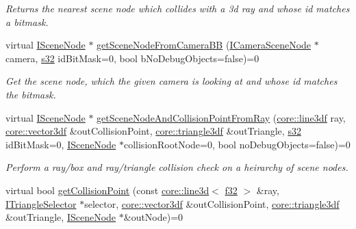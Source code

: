 \begin{DoxyCompactItemize}
\begin{DoxyCompactList}\small\item\em Returns the nearest scene node which collides with a 3d ray and whose id matches a bitmask. \end{DoxyCompactList}\item 
virtual \hyperlink{classirr_1_1scene_1_1ISceneNode}{I\+Scene\+Node} $\ast$ \hyperlink{classirr_1_1scene_1_1ISceneCollisionManager_ab29e0a261409a95a20e15ee09cc0de64}{get\+Scene\+Node\+From\+Camera\+BB} (\hyperlink{classirr_1_1scene_1_1ICameraSceneNode}{I\+Camera\+Scene\+Node} $\ast$camera, \hyperlink{namespaceirr_ac66849b7a6ed16e30ebede579f9b47c6}{s32} id\+Bit\+Mask=0, bool b\+No\+Debug\+Objects=false)=0
\begin{DoxyCompactList}\small\item\em Get the scene node, which the given camera is looking at and whose id matches the bitmask. \end{DoxyCompactList}\item 
virtual \hyperlink{classirr_1_1scene_1_1ISceneNode}{I\+Scene\+Node} $\ast$ \hyperlink{classirr_1_1scene_1_1ISceneCollisionManager_a25af822d52bce9acd88adfc7ce484982}{get\+Scene\+Node\+And\+Collision\+Point\+From\+Ray} (\hyperlink{namespaceirr_1_1core_acadb288f9aca3bf2d1222abcdf77114e}{core\+::line3df} ray, \hyperlink{namespaceirr_1_1core_ae6e2b2a6c552833ebbd5b7463d03586b}{core\+::vector3df} \&out\+Collision\+Point, \hyperlink{namespaceirr_1_1core_a8983bda2678a7a67d97bf3c7be6c31c7}{core\+::triangle3df} \&out\+Triangle, \hyperlink{namespaceirr_ac66849b7a6ed16e30ebede579f9b47c6}{s32} id\+Bit\+Mask=0, \hyperlink{classirr_1_1scene_1_1ISceneNode}{I\+Scene\+Node} $\ast$collision\+Root\+Node=0, bool no\+Debug\+Objects=false)=0
\begin{DoxyCompactList}\small\item\em Perform a ray/box and ray/triangle collision check on a heirarchy of scene nodes. \end{DoxyCompactList}\item 
virtual bool \hyperlink{classirr_1_1scene_1_1ISceneCollisionManager_a0adcf9dca228fac89b085144141f33b0}{get\+Collision\+Point} (const \hyperlink{classirr_1_1core_1_1line3d}{core\+::line3d}$<$ \hyperlink{namespaceirr_a0277be98d67dc26ff93b1a6a1d086b07}{f32} $>$ \&ray, \hyperlink{classirr_1_1scene_1_1ITriangleSelector}{I\+Triangle\+Selector} $\ast$selector, \hyperlink{namespaceirr_1_1core_ae6e2b2a6c552833ebbd5b7463d03586b}{core\+::vector3df} \&out\+Collision\+Point, \hyperlink{namespaceirr_1_1core_a8983bda2678a7a67d97bf3c7be6c31c7}{core\+::triangle3df} \&out\+Triangle, \hyperlink{classirr_1_1scene_1_1ISceneNode}{I\+Scene\+Node} $\ast$\&out\+Node)=0

\end{DoxyCompactItemize}

